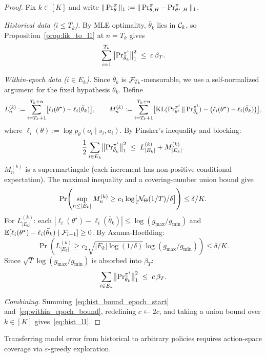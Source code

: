 \begin{proof}
Fix $k\in[K]$ and write $\|\operatorname{Pr}_\theta^\pi\|_1:=\|\operatorname{Pr}_{\theta,H}^\pi-\operatorname{Pr}_{\theta^\star,H}^\pi\|_1$.

\emph{Historical data ($i\le T_k$).}
By MLE optimality, $\bar\theta_k$ lies in ${\mathcal{C}}_k$, so Proposition~\ref{prop:lik_to_l1} at $n=T_k$ gives
\begin{equation}\label{eq:hist_bound_epoch_start}
\sum_{i=1}^{T_k}\bigl\|\operatorname{Pr}_{\bar\theta_k}^{\pi^i}\bigr\|_1^2\;\le\;c\,\beta_T.
\end{equation}

\emph{Within-epoch data ($i\in E_k$).}
Since $\bar\theta_k$ is ${\mathcal{F}}_{T_k}$-measurable, we use a self-normalized argument for the fixed hypothesis $\bar\theta_k$. Define
\[
L_n^{(k)}:=\sum_{i=T_k+1}^{T_k+n}\bigl[\ell_i(\theta^\star)-\ell_i(\bar\theta_k)\bigr],
\qquad
M_n^{(k)}:=\sum_{i=T_k+1}^{T_k+n}\bigl[\mathrm{KL}(\operatorname{Pr}_{\theta^\star}^{\pi^i}\|\operatorname{Pr}_{\bar\theta_k}^{\pi^i})-\bigl(\ell_i(\theta^\star)-\ell_i(\bar\theta_k)\bigr)\bigr],
\]
where $\ell_i(\theta):=\log p_\theta(o_i\mid s_i,a_i)$. By Pinsker's inequality and blocking:
\begin{equation}\label{eq:pinsker_within}
\frac{1}{2}\sum_{i\in E_k}\bigl\|\operatorname{Pr}_{\bar\theta_k}^{\pi^i}\bigr\|_1^2
\;\le\;
L_{|E_k|}^{(k)}+M_{|E_k|}^{(k)}.
\end{equation}
$M_n^{(k)}$ is a supermartingale (each increment has non-positive conditional expectation). The maximal inequality and a covering-number union bound give
\[
\Pr\!\left(\sup_{n\le|E_k|}M_n^{(k)}\ge c_1\log\bigl[{\mathcal{N}}_\Theta(1/T)/\delta\bigr]\right)\le\delta/K.
\]
For $L_{|E_k|}^{(k)}$: each $|\ell_i(\theta^\star)-\ell_i(\bar\theta_k)|\le\log(g_{\max}/g_{\min})$ and $\mathbb{E}[\ell_i(\theta^\star)-\ell_i(\bar\theta_k)\mid{\mathcal{F}}_{i-1}]\ge 0$. By Azuma-Hoeffding:
\[
\Pr\!\left(L_{|E_k|}^{(k)}\ge c_2\sqrt{|E_k|\log(1/\delta)}\log(g_{\max}/g_{\min})\right)\le\delta/K.
\]
Since $\sqrt{T}\log(g_{\max}/g_{\min})$ is absorbed into $\beta_T$:
\begin{equation}\label{eq:within_epoch_bound}
\sum_{i\in E_k}\bigl\|\operatorname{Pr}_{\bar\theta_k}^{\pi^i}\bigr\|_1^2
\;\le\;c\,\beta_T.
\end{equation}

\emph{Combining.} Summing~\eqref{eq:hist_bound_epoch_start} and~\eqref{eq:within_epoch_bound}, redefining $c\leftarrow 2c$, and taking a union bound over $k\in[K]$ gives~\eqref{eq:hist_l1}.
\end{proof}

Transferring model error from historical to arbitrary policies requires action-space coverage via $\varepsilon$-greedy exploration.

